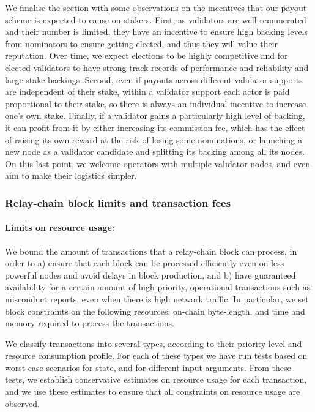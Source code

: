 \documentclass{article}
\begin{document}
We finalise the section with some observations on the incentives that our payout scheme is expected to cause on stakers. 
First, as validators are well remunerated and their number is limited, 
they have an incentive to ensure high backing levels from nominators to ensure getting elected, 
and thus they will value their reputation. Over time, we expect elections to be highly competitive 
and for elected validators to have strong track records of performance and reliability and large stake backings.
Second, even if payouts across different validator supports are independent of their stake, 
within a validator support each actor is paid proportional to their stake, 
so there is always an individual incentive to increase one's own stake. 
Finally, if a validator gains a particularly high level of backing, it can profit from it by either increasing 
its commission fee, which has the effect of raising its own reward at the risk of losing some nominations, 
or launching a new node as a validator candidate and splitting its backing among all its nodes. 
On this last point, we welcome operators with multiple validator nodes, 
and even aim to make their logistics simpler. 


\subsubsection{Relay-chain block limits and transaction fees}

\paragraph{Limits on resource usage:} We bound the amount of transactions that a relay-chain block can process, 
in order to a) ensure that each block can be processed efficiently even on less powerful nodes and avoid delays in block production, and b) have guaranteed availability for a certain amount of high-priority, operational transactions such as misconduct reports, even when there is high network traffic. 
In particular, we set block constraints on the following resources: on-chain byte-length, 
and time and memory required to process the transactions.

We classify transactions into several types, according to their priority level and resource consumption profile. 
For each of these types we have run tests based on worst-case scenarios for state, and for different input arguments. 
From these tests, we establish conservative estimates on resource usage for each transaction, and we use these estimates to ensure that all constraints on resource usage are observed.
\end{document}
